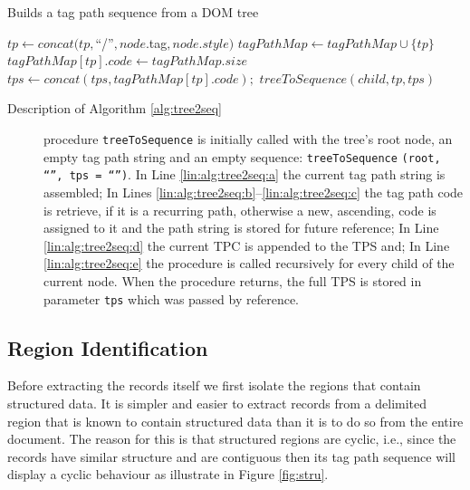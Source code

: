 \documentclass{vldb}
\begin{document}
\begin{algorithm}[H]
\caption{Builds a tag path sequence from a DOM tree}
\label{alg:tree2seq}
\begin{algorithmic}[1]
\State $tp \leftarrow
concat(tp,$``/''$,node.$tag$,node.style)$\label{lin:alg:tree2seq:a}
 \label{lin:alg:tree2seq:b}
\State $tagPathMap \leftarrow tagPathMap \cup \{tp\}$ 
\State $tagPathMap[tp].code \leftarrow tagPathMap.size$ 
\EndIf \label{lin:alg:tree2seq:c}
\State $tps \leftarrow
concat(tps,tagPathMap[tp].code);$\label{lin:alg:tree2seq:d}
\State $treeToSequence(child,tp,tps)$\label{lin:alg:tree2seq:e} 
\EndFor 
\EndProcedure
\end{algorithmic}
\end{algorithm}

\begin{description}
\item[Description of Algorithm \ref{alg:tree2seq}] procedure
\texttt{treeToSequence} is initially called with the tree's root node, an empty
tag path string and an empty sequence: \texttt{treeToSequence} \texttt{(root,
``'', tps = ``'')}. In Line \ref{lin:alg:tree2seq:a} the current tag path string is
assembled; In Lines \ref{lin:alg:tree2seq:b}--\ref{lin:alg:tree2seq:c} the tag
path code is retrieve, if it is a recurring path, otherwise a new, ascending,
code is assigned to it and the path string is stored for future reference; In
Line \ref{lin:alg:tree2seq:d} the current TPC is appended to the TPS and; In
Line \ref{lin:alg:tree2seq:e} the procedure is called recursively for every
child of the current node. When the procedure returns, the full TPS is stored in
parameter \texttt{tps} which was passed by reference.
\end{description}

\subsection{Region Identification}\label{ss:regi}

Before extracting the records itself we first isolate the regions that contain
structured data. It is simpler and easier to extract records from a delimited
region that is known to contain structured data than it is to do so from the
entire document. The reason for this is that structured regions are cyclic,
i.e., since the records have similar structure and are contiguous then its tag
path sequence will display a cyclic behaviour as illustrate in Figure
\ref{fig:stru}.
\end{document}
